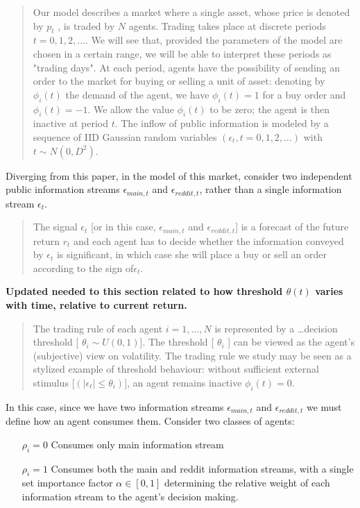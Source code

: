 \documentclass[a4paper, 11pt]{report}
\begin{document}
\begin{quote}
	Our model describes a market where a single asset, whose price is denoted by $p_{t}$ , is traded by
	$N$ agents. Trading takes place at discrete periods $t = 0, 1, 2,\dots$. We will see that, provided
	the parameters of the model are chosen in a certain range, we will be able to interpret these
	periods as "trading days". At each period, agents have the possibility of sending an order to
	the market for buying or selling a unit of asset: denoting by $\phi_{i}(t)$ the demand of the agent,
	we have $\phi_{i}(t) = 1$ for a buy order and $\phi_{i}(t) = -1$. We allow the value $\phi_{i}(t)$ to be zero; the
	agent is then inactive at period $t$. The inflow of public information is modeled by a sequence
	of IID Gaussian random variables $(\epsilon_{t},t = 0, 1, 2,\dots)$ with $t \sim N(0, D^{2})$.
\end{quote}
Diverging from this paper, in the model of this market, consider two independent public information streams $\epsilon_{main,t}$ and $\epsilon_{reddit,t}$, rather than a single information stream $\epsilon_{t}$.
\begin{quote}
	The signal $\epsilon_{t}$ [or in this case, $\epsilon_{main,t}$ and $\epsilon_{reddit,t}$] is a forecast of
	the future return $r_{t}$ and each agent has to decide whether the information conveyed by $\epsilon_{t}$ is
	significant, in which case she will place a buy or sell an order according to the sign of$\epsilon_{t}$.
\end{quote}
\textbf{Updated needed to this section related to how threshold $\theta(t)$ varies with time, relative to current return.}
\begin{quote}
	The trading rule of each agent $i = 1,..., N$ is represented by a \dots decision
	threshold [ $\theta_{i} \sim U(0,1)$]. The threshold [ $\theta_{i}$ ] can be viewed as the agent’s (subjective) view on volatility.
	The trading rule we study may be seen as a stylized example of threshold behaviour: without
	sufficient external stimulus [$(|\epsilon_{t}| \leq \theta_{i})$], an agent remains inactive $\phi_{i}(t) = 0$.
\end{quote}
In this case, since we have two information streams $\epsilon_{main,t}$ and $\epsilon_{reddit,t}$ we must define how an agent consumes them. Consider two classes of agents:
\begin{itemize}
	\item [$\rho_{i} = 0$] Consumes only main information stream
	\item [$\rho_{i} = 1$] Consumes both the main and reddit information streams, with a single set importance factor $\alpha \in [0,1]$ determining the relative weight of each information stream to the agent's decision making. 
\end{itemize}
\end{document}
